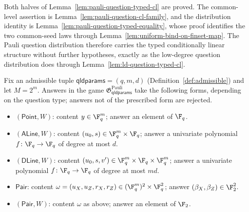 \begin{remark}\label{rem:pauli-question-typed-cl-status}
	Both halves of Lemma~\ref{lem:pauli-question-typed-cl} are proved. The common-level assertion is Lemma~\ref{lem:pauli-question-cl-family}, and the distribution identity is Lemma~\ref{lem:pauli-question-typed-equality}, whose proof identifies the two common-seed laws through Lemma~\ref{lem:uniform-bind-on-finset-map}. The Pauli question distribution therefore carries the typed conditionally linear structure without further hypotheses, exactly as the low-degree question distribution does through Lemma~\ref{lem:ld-question-typed-cl}.
\end{remark}

\begin{definition}\label{def:pauli-win-predicate}
	\leanok
	Fix an admissible tuple $\mathsf{qldparams} = (q,m,d)$ (Definition~\ref{def:admissible}) and let $M = 2^m$. Answers in the game $\mathfrak{G}^{\mathrm{Pauli}}_{\mathsf{qldparams}}$ take the following forms, depending on the question type; answers not of the prescribed form are rejected.
	\begin{itemize}
		\item $(\mathsf{Point},W)$: content $y \in \F_q^m$; answer an element of $\F_q$.
		\item $(\mathsf{ALine},W)$: content $(u_0, s) \in \F_q^m \times \F_q$; answer a univariate polynomial $f\colon \F_q \to \F_q$ of degree at most $d$.
		\item $(\mathsf{DLine},W)$: content $(u_0, s, v') \in \F_q^m \times \F_q \times \F_q^m$; answer a univariate polynomial $f\colon \F_q \to \F_q$ of degree at most $md$.
		\item $\mathsf{Pair}$: content $\omega = (u_X, u_Z, r_X, r_Z) \in (\F_q^m)^2 \times \F_q^2$; answer $(\beta_X, \beta_Z) \in \F_2^2$.
		\item $(\mathsf{Pair},W)$: content $\omega$ as above; answer an element of $\F_2$.

\end{itemize}
\end{definition}
